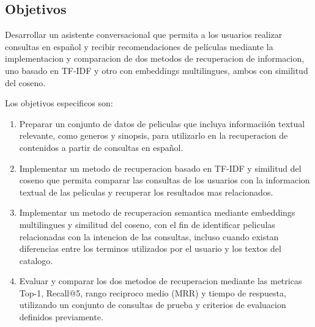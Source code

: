 ﻿\subsection{Objetivos}
Desarrollar un asistente conversacional que permita a los usuarios realizar consultas en español y recibir recomendaciones de películas mediante la implementacion y comparacion de dos metodos de recuperacion de informacion, uno basado en TF-IDF y otro con embeddings multilingues, ambos con similitud del coseno.

Los objetivos especi­ficos son:
\begin{enumerate}
\item Preparar un conjunto de datos de peli­culas que incluya informaciión textual relevante, como generos y sinopsis, para utilizarlo en la recuperacio­n de contenidos a partir de consultas en español.
\item Implementar un metodo de recuperacion basado en TF-IDF y similitud del coseno que permita comparar las consultas de los usuarios con la informacion textual de las peli­culas y recuperar los resultados mas relacionados.
\item Implementar un metodo de recuperacion semantica mediante embeddings multilingues y similitud del coseno, con el fin de identificar peli­culas relacionadas con la intencion de las consultas, incluso cuando existan diferencias entre los terminos utilizados por el usuario y los textos del catalogo.
\item Evaluar y comparar los dos metodos de recuperacion mediante las metricas Top-1, Recall@5, rango reciproco medio (MRR) y tiempo de respuesta, utilizando un conjunto de consultas de prueba y criterios de evaluacion definidos previamente.
\end{enumerate}
